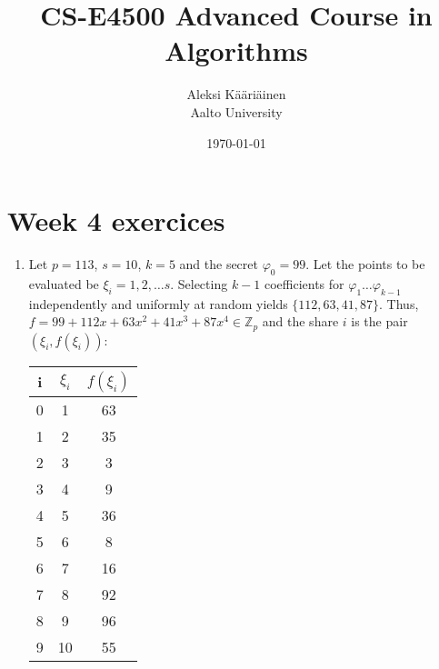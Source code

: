 \documentclass[11pt,a4paper]{article}
\title{CS-E4500 Advanced Course in Algorithms}
\author{Aleksi Kääriäinen  \\
	Aalto University  \\
	}
\begin{document}
\date{\today}

\maketitle

\newpage

\section*{Week 4 exercices}

\begin{enumerate}
    \item
          Let $p = 113$, $s = 10$, $k = 5$ and the secret $\varphi_0 = 99$. Let the points to be evaluated be $\xi_i =  1, 2, \dots s$.
          Selecting $k - 1$ coefficients for $\varphi_{1}  \dots \varphi_{k - 1}$ independently and uniformly at random yields $\{112, 63, 41, 87\}$.
          Thus, $f = 99 + 112x + 63x^2 + 41x^3 + 87x^4 \in \mathbb{Z}_p$ and the share $i$ is the pair $(\xi_i, f(\xi_i))$:

          \begin{center}
              \begin{tabular}{c|c|c}
                  i & $\xi_i$ & $f(\xi_i)$ \\
                  \hline
                  0 & 1       & 63         \\
                  1 & 2       & 35         \\
                  2 & 3       & 3          \\
                  3 & 4       & 9          \\
                  4 & 5       & 36         \\
                  5 & 6       & 8          \\
                  6 & 7       & 16         \\
                  7 & 8       & 92         \\
                  8 & 9       & 96         \\
                  9 & 10      & 55         \\
              \end{tabular}
          \end{center}


\end{enumerate}
\end{document}
